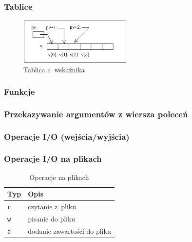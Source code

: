\subsubsection{Tablice}

\begin{figure}[!h]
\centering
\includegraphics[width=0.5\textwidth]{img/tablica}
\caption{Tablica a~wskaźnika}
\label{fig:tablica}
\end{figure}

\subsubsection{Funkcje}

\subsubsection{Przekazywanie argumentów z wiersza poleceń}

\subsubsection{Operacje I/O (wejścia/wyjścia)}

\subsubsection{Operacje I/O na plikach}

\begin{table}[h!]
\centering
\caption{Operacje na plikach}
\setlength{\arrayrulewidth}{1pt}
\setlength{\tabcolsep}{6pt}
\renewcommand{\arraystretch}{1.2}
\begin{tabular}{ |p{}|p{}|}
\hline \rowcolor{gray}
\textbf{Typ} & \textbf{Opis} \\ \hline
\mbox{\lstinline[style=MyBashStyle]{r}} & czytanie z~pliku \\ \hline
\mbox{\lstinline[style=MyBashStyle]{w}} & pisanie do pliku \\ \hline
\mbox{\lstinline[style=MyBashStyle]{a}} & dodanie zawartości do pliku \\ \hline
\end{tabular}
\label{tab:operacjenaplikach}
\end{table}



